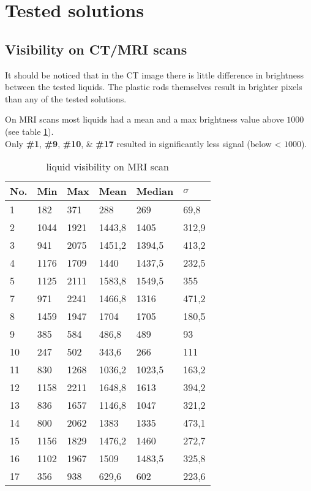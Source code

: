 \section{Tested solutions}

\subsection{Visibility on CT/MRI scans}

It should be noticed that in the CT image there is little difference in brightness between the tested liquids.
The plastic rods themselves result in brighter pixels than any of the tested solutions.

On MRI scans most liquids had a mean and a max brightness value above $1000$ (see table \ref{tab:visibility}).\\
Only \textbf{\#1}, \textbf{\#9}, \textbf{\#10}, \& \textbf{\#17} resulted in significantly less signal (below < $1000$).


\begin{table}[!htb]
\centering
\begin{tabular}{@{}l|lllll@{}}
\toprule
No. & Min  & Max  & Mean   & Median & $\sigma$ \\ \midrule
1   & 182  & 371  & 288    & 269    & 69,8     \\
2   & 1044 & 1921 & 1443,8 & 1405   & 312,9    \\
3   & 941  & 2075 & 1451,2 & 1394,5 & 413,2    \\
4   & 1176 & 1709 & 1440   & 1437,5 & 232,5    \\
5   & 1125 & 2111 & 1583,8 & 1549,5 & 355      \\
7   & 971  & 2241 & 1466,8 & 1316   & 471,2    \\
8   & 1459 & 1947 & 1704   & 1705   & 180,5    \\
9   & 385  & 584  & 486,8  & 489    & 93       \\
10  & 247  & 502  & 343,6  & 266    & 111      \\
11  & 830  & 1268 & 1036,2 & 1023,5 & 163,2    \\
12  & 1158 & 2211 & 1648,8 & 1613   & 394,2    \\
13  & 836  & 1657 & 1146,8 & 1047   & 321,2    \\
14  & 800  & 2062 & 1383   & 1335   & 473,1    \\
15  & 1156 & 1829 & 1476,2 & 1460   & 272,7    \\
16  & 1102 & 1967 & 1509   & 1483,5 & 325,8    \\
17  & 356  & 938  & 629,6  & 602    & 223,6    \\ \bottomrule
\end{tabular}
\caption{liquid visibility on MRI scan}
\label{tab:visibility}
\end{table}

